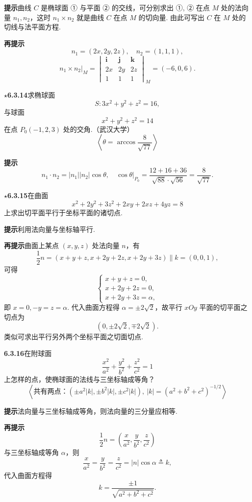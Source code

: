 \documentclass[UTF8,12pt,a4paper,fontset=fandol]{ctexart}
\begin{document}
\noindent\textbf{提示}\quad 曲线 $C$ 是椭球面 ① 与平面 ② 的交线，可分别求出 ①, ② 在点 $M$ 处的法向量 $n_1,n_2$，这时 $n_1\times n_2$ 就是曲线 $C$ 在点 $M$ 的切向量. 由此可写出 $C$ 在 $M$ 处的切线与法平面方程.

\noindent\textbf{再提示}\quad
\[
  n_1=(2x,2y,2z),\quad n_2=(1,1,1),
\]
\[
  n_1\times n_2\big|_M=
  \begin{vmatrix}
    \mathbf{i}&\mathbf{j}&\mathbf{k}\\
    2x&2y&2z\\
    1&1&1
  \end{vmatrix}_M
  =(-6,0,6).
\]

\noindent\textbf{\ensuremath{\star}6.3.14}\quad 求椭球面
\[
  S:3x^2+y^2+z^2=16, \tag{1}
\]
与球面
\[
  x^2+y^2+z^2=14 \tag{2}
\]
在点 $P_0(-1,2,3)$ 处的交角.（武汉大学）
\[
  \left\langle \theta=\arccos\frac{8}{\sqrt{77}}\right\rangle
\]

\noindent\textbf{提示}\quad
\[
  n_1\cdot n_2=|n_1||n_2|\cos\theta,\quad
  \cos\theta\big|_{P_0}=
  \frac{12+16+36}{\sqrt{88}\cdot\sqrt{56}}
  =\frac8{\sqrt{77}}.
\]

\noindent\textbf{\ensuremath{\star}6.3.15}\quad 在曲面
\[
  x^2+2y^2+3z^2+2xy+2xz+4yz=8
\]
上求出切平面平行于坐标平面的诸切点.

\noindent\textbf{提示}\quad 利用法向量与坐标轴平行.

\noindent\textbf{再提示}\quad 曲面上某点 $(x,y,z)$ 处法向量 $n$，有
\[
  \frac12n=(x+y+z,x+2y+2z,x+2y+3z)\parallel k=(0,0,1),
\]
可得
\[
  \begin{cases}
    x+y+z=0,\\
    x+2y+2z=0,\\
    x+2y+3z=\alpha,
  \end{cases}
\]
即 $x=0,-y=z=\alpha$. 代入曲面方程得 $\alpha=\pm2\sqrt2$，故平行 $xOy$ 平面的切平面之切点为
\[
  (0,\pm2\sqrt2,\mp2\sqrt2).
\]
类似可求出平行另外两个坐标平面之切面切点.

\noindent\textbf{6.3.16}\quad 在附球面
\[
  \frac{x^2}{a^2}+\frac{y^2}{b^2}+\frac{z^2}{c^2}=1
\]
上怎样的点，使椭球面的法线与三坐标轴成等角？
\[
  \left\langle
  \text{共有两点：}(\pm a^2|k|,\pm b^2|k|,\pm c^2|k|),
  \ |k|=(a^2+b^2+c^2)^{-1/2}
  \right\rangle
\]

\noindent\textbf{提示}\quad 法向量与三坐标轴成等角，则法向量的三分量应相等.

\noindent\textbf{再提示}\quad
\[
  \frac12n=\left(\frac{x}{a^2},\frac{y}{b^2},\frac{z}{c^2}\right)
\]
与三坐标轴成等角 $\alpha$，则
\[
  \frac{x}{a^2}=\frac{y}{b^2}=\frac{z}{c^2}=|n|\cos\alpha\triangleq k,
\]
代入曲面方程得
\[
  k=\frac{\pm1}{\sqrt{a^2+b^2+c^2}}.
\]
\end{document}

